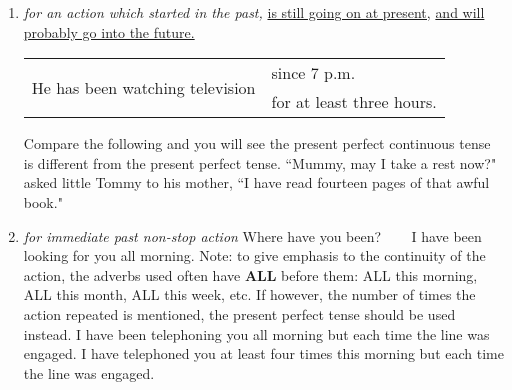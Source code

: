 \begin{enumerate}
    \item {\it for an action which started in the past,}
        \newline
        \underline{is still going on at present,}
        \newline
        \underline{and will probably go into the future.}
        \newline
        \newline
        \begin{tabular}{ll}
            \multirow{2}{*}{He has been watching television}
            & since 7 p.m. \\
            & for at least three hours.
        \end{tabular}
        \newline
        \newline
        Compare the following and you will see the present perfect continuous
        tense is different from the present perfect tense.
        \newline
        \newline
        ``Mummy, may I take a rest now?" asked little Tommy to his mother,
        ``I have read fourteen pages of that awful book."
    \item {\it for immediate past non-stop action}
        \newline
        \newline
        Where have you been? ~~~ I have been looking for you all morning.
        \newline
        \newline
        Note: to give emphasis to the continuity of the action, the adverbs used
        often have \textbf{ALL} before them:
        \newline
        \newline
        ALL this morning, ALL this month, ALL this week, etc.
        If however, the number of times the action repeated is mentioned,
        the present perfect tense should be used instead.
        \newline
        \newline
        I have been telephoning you all morning but each time the line was engaged.
        \newline
        \newline
        I have telephoned you at least four times this morning but each time the line was engaged.
\end{enumerate}

